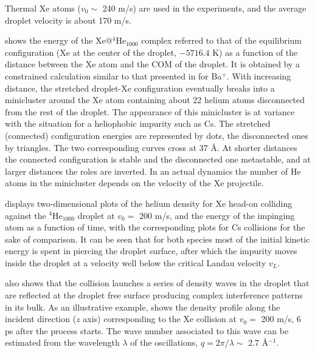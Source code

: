 		Thermal Xe atoms ($v_0 \sim$ 240 m/s) are used in the experiments\citep{Gom14,Jon16}, and the average droplet velocity is about 170 m/s\citep{Gom11}.

		 shows the energy of  the Xe@$^4$He$_{1000}$ complex  referred to that of the equilibrium configuration (Xe at the center of the droplet, $-5716.4$ K) as a function of the distance between the Xe  atom and  the COM of the droplet. It is obtained by a constrained calculation similar to that presented in for Ba$^+$. 
With increasing distance, the stretched droplet-Xe configuration eventually breaks into a minicluster around the Xe atom containing 
about 22 helium atoms disconnected from the rest of the droplet.
The appearance of this minicluster is at variance with the situation for a heliophobic impurity such as Cs\citep{Lea14a}.
The stretched (connected) configuration energies are represented by dots, the disconnected ones by triangles.
The two corresponding curves cross at  37 \AA{}.
At shorter distances the connected configuration is stable and the disconnected one metastable, and at larger distances the roles are inverted.
In an actual dynamics the number of He atoms in the minicluster  depends on the velocity of the Xe projectile.

  displays two-dimensional plots of the helium density for Xe  head-on  colliding against the $^4$He$_{1000}$
 droplet at $v_0=$ 200 m/s, and  the energy of the impinging atom as a function of time,
 with the corresponding plots for Cs collisions for the sake of comparison.  It can be seen that for both species
 most of the initial kinetic energy is spent in piercing the droplet surface, after which the impurity moves inside the droplet  
at a velocity  well below the critical Landau velocity  $v_L$. 
 
 also shows that the collision launches a series of density waves in the droplet 
  that are reflected at the droplet free surface producing  complex interference patterns in
 its bulk. As an illustrative example,  shows the density profile along the incident direction ($z$ axis) corresponding to the Xe collision at $v_0=$
 200 m/s, 6 ps after the process starts.
 The wave number  associated to this  wave can be estimated from the wavelength $\lambda$  of the 
  oscillations, $q = 2 \pi/\lambda \sim$ 2.7 \AA$^{-1}$.

